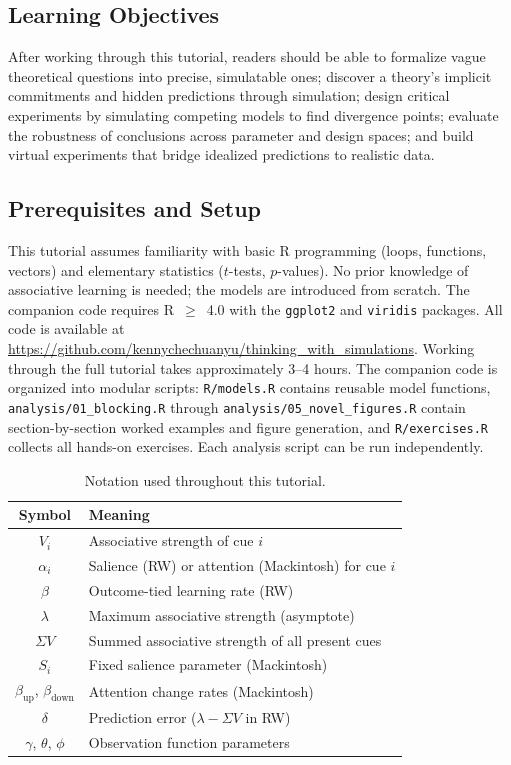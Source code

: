 \documentclass[fleqn,10pt]{wlscirep}
\begin{document}
\begin{linenumbers}
\subsection*{Learning Objectives}

After working through this tutorial, readers should be able to formalize vague theoretical questions into precise, simulatable ones; discover a theory's implicit commitments and hidden predictions through simulation; design critical experiments by simulating competing models to find divergence points; evaluate the robustness of conclusions across parameter and design spaces; and build virtual experiments that bridge idealized predictions to realistic data.

\subsection*{Prerequisites and Setup}

This tutorial assumes familiarity with basic R programming (loops, functions, vectors) and elementary statistics ($t$-tests, $p$-values). No prior knowledge of associative learning is needed; the models are introduced from scratch. The companion code requires R~$\geq$~4.0 with the \texttt{ggplot2} and \texttt{viridis} packages. All code is available at \url{https://github.com/kennychechuanyu/thinking_with_simulations}. Working through the full tutorial takes approximately 3--4 hours. The companion code is organized into modular scripts: \texttt{R/models.R} contains reusable model functions, \texttt{analysis/01\_blocking.R} through \texttt{analysis/05\_novel\_figures.R} contain section-by-section worked examples and figure generation, and \texttt{R/exercises.R} collects all hands-on exercises. Each analysis script can be run independently.

\begin{table}[t]
\centering
\small
\caption{Notation used throughout this tutorial.}
\label{tab:notation}
\begin{tabular}{cl}
\toprule
\textbf{Symbol} & \textbf{Meaning} \\
\midrule
$V_i$ & Associative strength of cue $i$ \\
$\alpha_i$ & Salience (RW) or attention (Mackintosh) for cue $i$ \\
$\beta$ & Outcome-tied learning rate (RW) \\
$\lambda$ & Maximum associative strength (asymptote) \\
$\Sigma V$ & Summed associative strength of all present cues \\
$S_i$ & Fixed salience parameter (Mackintosh) \\
$\beta_{\text{up}}$, $\beta_{\text{down}}$ & Attention change rates (Mackintosh) \\
$\delta$ & Prediction error ($\lambda - \Sigma V$ in RW) \\
$\gamma$, $\theta$, $\phi$ & Observation function parameters \\
\bottomrule
\end{tabular}
\end{table}


\end{linenumbers}
\end{document}
